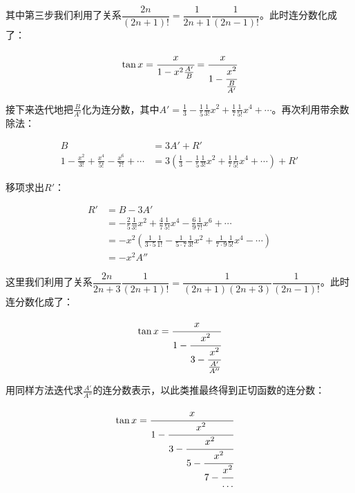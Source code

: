 其中第三步我们利用了关系$\dfrac{2n}{(2n + 1)!} = \dfrac{1}{2n+1}\dfrac{1}{(2n-1)!}$。此时连分数化成了：

\[
\tan x = \cfrac{x}{1 - x^2\frac{A'}{B}} = \cfrac{x}{1 - \cfrac{x^2}{\frac{B}{A'}}}
\]

接下来迭代地把$\frac{B}{A'}$化为连分数，其中$A' = \frac{1}{3} - \frac{1}{5}\frac{1}{3!}x^2 + \frac{1}{7}\frac{1}{5!}x^4 + \dotsb$。再次利用带余数除法：

\begin{align*}
B &= 3A' + R'  \\
1 - \frac{x^2}{3!} + \frac{x^4}{5!} - \frac{x^6}{7!} + \dotsb &= 3(\frac{1}{3} - \frac{1}{5}\frac{1}{3!}x^2 + \frac{1}{7}\frac{1}{5!}x^4 + \dotsb) + R'
\end{align*}

移项求出$R'$：

\begin{align*}
R' &= B - 3A' \\
   &= - \frac{2}{5}\frac{1}{3!}x^2 + \frac{4}{7}\frac{1}{5!}x^4 - \frac{6}{9}\frac{1}{7!}x^6 + \dotsb \\
   &= -x^2(\frac{1}{3 \cdot 5}\frac{1}{1!} - \frac{1}{5 \cdot 7}\frac{1}{3!}x^2 + \frac{1}{7 \cdot 9}\frac{1}{5!}x^4 - \dotsb) \\
   &= -x^2 A''
\end{align*}

这里我们利用了关系$\dfrac{2n}{2n+3}\dfrac{1}{(2n+1)!} = \dfrac{1}{(2n + 1)(2n + 3)}\dfrac{1}{(2n - 1)!}$。此时连分数化成了：

\[
\tan x = \cfrac{x}{1 - \cfrac{x^2}{3 - \cfrac{x^2}{\frac{A'}{A''}}}}
\]

用同样方法迭代求$\frac{A'}{A''}$的连分数表示，以此类推最终得到正切函数的连分数：

\begin{align*}
\tan x  &= \cfrac{x}{1 - \cfrac{x^2}{3 - \cfrac{x^2}{5 - \cfrac{x^2}{7 - \cfrac{x^2}{\dotso}}}}}
\end{align*}
